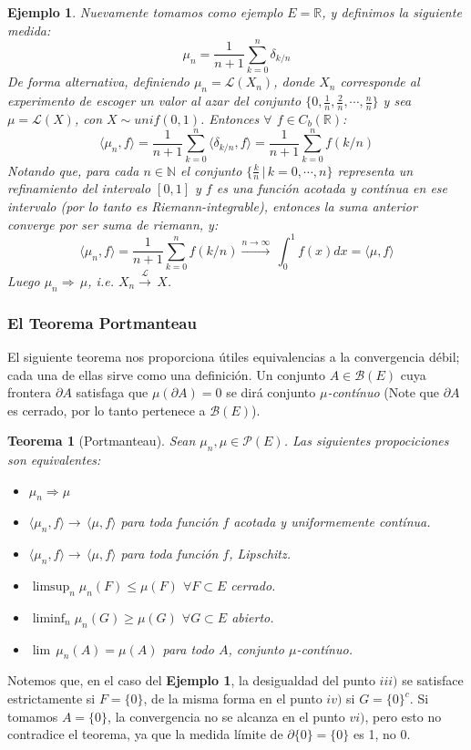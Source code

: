 \documentclass[a4paper]{article}
\newtheorem{teorema}{Teorema}
\newtheorem{ejemplo}{Ejemplo}
\numberwithin{equation}{subsection}
\def\R{\mathbb R}
\def\N{\mathbb N}
\begin{document}
\begin{ejemplo}
    Nuevamente tomamos como ejemplo $E=\R$, y definimos la siguiente medida:
    \[\mu_n = \frac{1}{n+1}\sum_{k=0}^{n}\delta_{k/n}\]
    De forma alternativa, definiendo $\mu_n = \mathcal{L}(X_n)$, donde $X_n$ corresponde al experimento de escoger un valor al azar del conjunto $\{0,\frac{1}{n},\frac{2}{n},\cdots,\frac{n}{n}\}$ y sea $\mu = \mathcal{L}(X)$, con $X\sim unif(0,1)$. Entonces $\forall$ $f\in C_b(\R)$:
    \[\langle \mu_n ,f\rangle = \frac{1}{n+1}\sum_{k=0}^{n} \langle \delta_{k/n},f\rangle = \frac{1}{n+1}\sum_{k=0}^{n}f(k/n)\]
    Notando que, para cada $n\in\N$ el conjunto $\{\frac{k}{n}\,|\,k=0,\cdots,n\}$ representa un refinamiento del intervalo $[0,1]$ y $f$ es una función acotada y contínua en ese intervalo (por lo tanto es \textit{Riemann-integrable}), entonces la suma anterior converge por ser suma de riemann, y:
    \[\langle \mu_n ,f\rangle = \frac{1}{n+1}\sum_{k=0}^{n}f(k/n) \xrightarrow{n\rightarrow\infty}\, \int_{0}^{1}f(x)dx = \langle \mu,f\rangle\]
    Luego $\mu_n \Rightarrow\,\mu$, i.e. $X_n \xrightarrow{\mathcal{L}}\,X$.
\end{ejemplo}
\subsubsection{El Teorema Portmanteau}
El siguiente teorema nos proporciona útiles equivalencias a la convergencia débil; cada una de ellas sirve como una definición. Un conjunto $A \in \mathcal{B}(E)$ cuya frontera $\partial A$ satisfaga que $\mu(\partial A) = 0$ se dirá conjunto \textit{$\mu$-contínuo} (Note que $\partial A$ es cerrado, por lo tanto pertenece a $\mathcal{B}(E)$).
\begin{teorema}[Portmanteau] Sean $\mu_n,\mu \in \mathcal{P}(E)$. Las siguientes propociciones son equivalentes:
\begin{itemize}
    \item[i)] $\mu_n \Rightarrow \mu$
    \item[ii)] $\langle \mu_n,f\rangle \rightarrow\, \langle \mu, f\rangle$ para toda función $f$ acotada y uniformemente contínua.
    \item[iii)] $\langle \mu_n , f \rangle \rightarrow\, \langle \mu, f\rangle$ para toda función $f$, Lipschitz.
    \item[iv)] $\limsup_n \mu_n(F) \leq \mu(F)$   $\forall F \subset E$ cerrado.
    \item[v)] $\liminf_n \mu_n(G) \geq \mu(G)$     $\forall G\subset E$ abierto.
    \item[vi)] $\lim\, \mu_n(A) = \mu(A)$ para todo $A$, conjunto \textit{$\mu$-contínuo}. 
\end{itemize}
\end{teorema}
Notemos que, en el caso del \textbf{Ejemplo 1}, la desigualdad del punto $iii)$ se satisface estrictamente si $F=\{0\}$, de la misma forma en el punto $iv)$ si $G=\{0\}^{c}$. Si tomamos $A=\{0\}$, la convergencia no se alcanza en el punto $vi)$, pero esto no contradice el teorema, ya que la medida límite de $\partial \{0\} = \{0\}$ es 1, no 0. 
\end{document}
